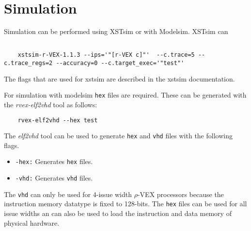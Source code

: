 \section{Simulation}
Simulation can be performed using XSTsim or with Modelsim. XSTsim can 

\begin{lstlisting}

	xstsim-r-VEX-1.1.3 --ips='"[r-VEX c]"'  --c.trace=5 --c.trace_regs=2 --accuracy=0 --c.target_exec='"test"'

\end{lstlisting}

The flags that are used for xstsim are described in the xstsim documentation.

For simulation with modelsim \texttt{hex} files are required. These can be generated with the \emph{rvex-elf2vhd} tool as follows:

\begin{lstlisting}
	rvex-elf2vhd --hex test
\end{lstlisting}

The \emph{elf2vhd} tool can be used to generate \texttt{hex} and \texttt{vhd} files with the following flags.

\begin{itemize}
	\item \texttt{-hex:} Generates \texttt{hex} files.
	\item \texttt{-vhd:} Generates \texttt{vhd} files.
\end{itemize}

The \texttt{vhd} can only be used for 4-issue width $\rho$-VEX processors because the instruction memory datatype is fixed to 128-bits. The \texttt{hex} files can be used for all issue widths an can also be used to load the instruction and data memory of physical hardware.

